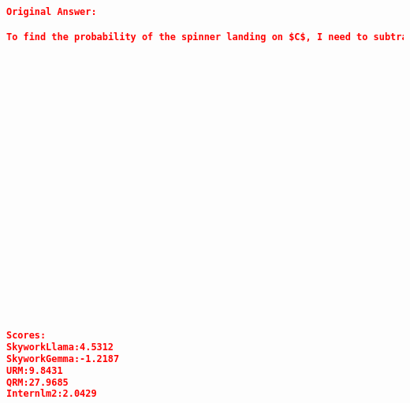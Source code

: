 \begin{lstlisting}[language=json,numbers=none]
Original Answer:

To find the probability of the spinner landing on $C$, I need to subtract the probabilities of the spinner landing on $A$ and $B$ from $1$, since the sum of the probabilities of all possible outcomes is $1$. I can write this as an equation: $P(C) = 1 - P(A) - P(B)$. I know that $P(A) = \frac{1}{3}$ and $P(B) = \frac{5}{12}$, so I can plug those values into the equation and simplify. I get: $P(C) = 1 - \frac{1}{3} - \frac{5}{12} = \frac{12}{12} - \frac{4}{12} - \frac{5}{12} = \frac{3}{12}$. I can reduce this fraction by dividing the numerator and denominator by $3$, and I get: $P(C) = \frac{1}{4}$. 





















  
Scores:
SkyworkLlama:4.5312
SkyworkGemma:-1.2187
URM:9.8431
QRM:27.9685
Internlm2:2.0429
\end{lstlisting}